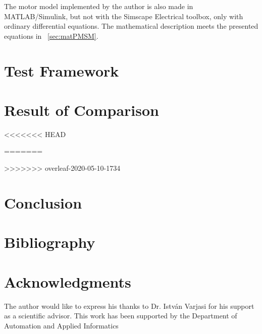\documentclass[twoside,b5paper,10pt]{article}
\begin{document}
The motor model implemented by the author is also made in MATLAB/Simulink, but not with the Simscape Electrical toolbox, only with ordinary differential equations. The mathematical description meets the presented equations in \sectionname~\ref{sec:matPMSM}.

\section{Test Framework}
\label{sec:test_framework}



\section{Result of Comparison}
\label{sec:results}

<<<<<<< HEAD





=======




>>>>>>> overleaf-2020-05-10-1734



\section{Conclusion}
\label{sec:conclusion}


\section{Bibliography}
\label{sec:bib}

\section*{Acknowledgments}
 { \small The author would like to express his thanks to Dr. István Varjasi for his support as a scientific advisor.
This work has been supported by the Department of Automation and Applied Informatics}

\end{document}

